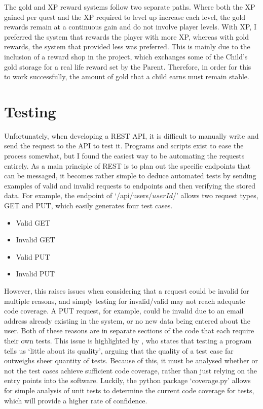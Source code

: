 The gold and XP reward systems follow two separate paths.
Where both the XP gained per quest and the XP required to level up increase each level, the gold rewards remain at a continuous gain and do not involve player levels.
With XP, I preferred the system that rewards the player with more XP, whereas with gold rewards, the system that provided less was preferred.
This is mainly due to the inclusion of a reward shop in the project, which exchanges some of the Child's gold storage for a real life reward set by the Parent. 
Therefore, in order for this to work successfully, the amount of gold that a child earns must remain stable.

\section{Testing}
Unfortunately, when developing a REST API, it is difficult to manually write and send the request to the API to test it.
Programs and scripts exist to ease the process somewhat, but I found the easiest way to be automating the requests entirely. 
As a main principle of REST is to plan out the specific endpoints that can be messaged, it becomes rather simple to deduce automated tests by sending examples of valid and invalid requests to endpoints and then verifying the stored data.
For example, the endpoint of `/api/users/$userId$/' allows two request types, GET and PUT, which easily generates four test cases.
\begin{itemize}
	\item{Valid GET}
	\item{Invalid GET}
	\item{Valid PUT}
	\item{Invalid PUT}
\end{itemize}  

However, this raises issues when considering that a request could be invalid for multiple reasons, and simply testing for invalid/valid may not reach adequate code coverage.
A PUT request, for example, could be invalid due to an email address already existing in the system, or no new data being entered about the user. Both of these reasons are in separate sections of the code that each require their own tests.
This issue is highlighted by \cite{4597151}, who states that testing a program tells us `little about its quality', arguing that the quality of a test case far outweighs sheer quantity of tests.
Because of this, it must be analysed whether or not the test cases achieve sufficient code coverage, rather than just relying on the entry points into the software.
Luckily, the python package `coverage.py' allows for simple analysis of unit tests to determine the current code coverage for tests, which will provide a higher rate of confidence.

